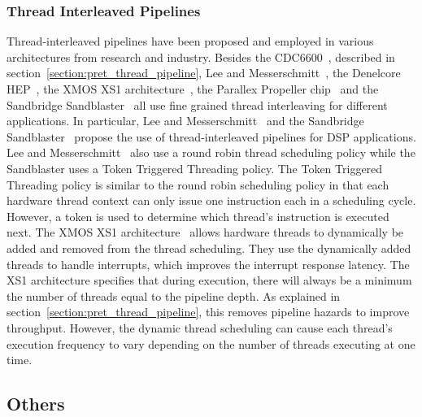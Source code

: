 \subsubsection{Thread Interleaved Pipelines}
Thread-interleaved pipelines have been proposed and employed in various architectures from research and industry. 
Besides the CDC6600~\cite{CDC6600}, described in section~\ref{section:pret_thread_pipeline}, Lee and Messerschmitt~\cite{lee1987pip}, the Denelcore HEP~\cite{HEP}, the XMOS XS1 architecture~\cite{xmos_xs1}, the Parallex Propeller chip~\cite{parallex} and the Sandbridge Sandblaster~\cite{Erdem02multi-threadedprocessor} all use fine grained thread interleaving for different applications. 
In particular, Lee and Messerschmitt~\cite{lee1987pip} and the Sandbridge Sandblaster~\cite{Erdem02multi-threadedprocessor} propose the use of thread-interleaved pipelines for DSP applications. Lee and Messerschmitt~\cite{lee1987pip} also use a round robin thread scheduling policy while the Sandblaster uses a Token Triggered Threading policy. 
The Token Triggered Threading policy is similar to the round robin scheduling policy in that each hardware thread context can only issue one instruction each in a scheduling cycle. 
However, a token is used to determine which thread's instruction is executed next. 
The XMOS XS1 architecture~\cite{xmos_xs1} allows hardware threads to dynamically be added and removed from the thread scheduling.
They use the dynamically added threads to handle interrupts, which improves the interrupt response latency. 
The XS1 architecture specifies that during execution, there will always be a minimum the number of threads equal to the pipeline depth. 
As explained in section~\ref{section:pret_thread_pipeline}, this removes pipeline hazards to improve throughput.
However, the dynamic thread scheduling can cause each thread's execution frequency to vary depending on the number of threads executing at one time.         

\subsection{Others}
